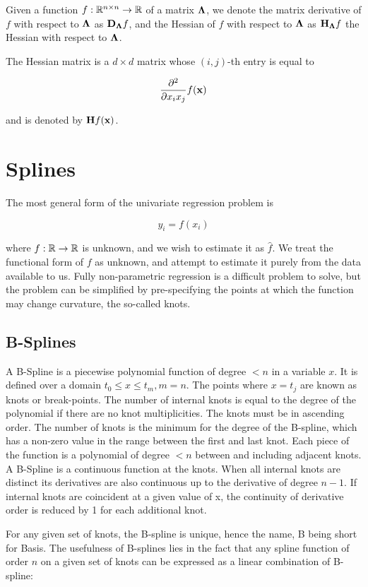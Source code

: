 \documentclass{amsart}[12pt]
\begin{document}
Given a function $f:{\mathbb{R}}^{n \times n} \to {\mathbb{R}}$ of a matrix ${\boldsymbol \Lambda}$, we denote the matrix derivative of $f$ with 
respect to ${\boldsymbol \Lambda}$ as ${\bf D}_{\boldsymbol \Lambda} f$, and the Hessian of $f$ with respect to ${\boldsymbol \Lambda}$ as
${\bf H}_{\boldsymbol \Lambda} f$ the Hessian with respect to ${\boldsymbol \Lambda}$.

The Hessian matrix is a $d \times d$ matrix whose $(i, j)$-th entry is equal to

$$
\frac{\partial^2}{\partial x_i x_j} f({\bf x})
$$

and is denoted by ${\bf H} f({\bf x})$.

\section{Splines}
The most general form of the univariate regression problem is

$$
y_i = f(x_i)
$$

where $f: {\mathbb{R}} \to {\mathbb{R}}$ is unknown, and we wish to estimate it as $\hat{f}$. We treat the functional form of
$f$ as unknown, and attempt to estimate it purely from the data available to us. Fully non-parametric regression
is a difficult problem to solve, but the problem can be simplified by pre-specifying the points at which the
function may change curvature, the so-called knots.

\subsection{B-Splines}
A B-Spline is a piecewise polynomial function of degree $< n$ in a variable $x$. It is defined over a
domain $t_0 \leq x \leq t_m, m=n$. The points where $x = t_j$ are known as knots or break-points. The
number of internal knots is equal to the degree of the polynomial if there are no knot multiplicities.
The knots must be in ascending order. The number of knots is the minimum for the degree of the B-spline,
which has a non-zero value in the range between the first and last knot. Each piece of the function is a
polynomial of degree $< n$ between and including adjacent knots. A B-Spline is a continuous function at the
knots. When all internal knots are distinct its derivatives are also continuous up to the derivative of degree
$n - 1$. If internal knots are coincident at a given value of x, the continuity of derivative order is reduced
by 1 for each additional knot.

For any given set of knots, the B-spline is unique, hence the name, B being short for Basis. The usefulness
of B-splines lies in the fact that any spline function of order $n$ on a given set of knots can be expressed
as a linear combination of B-spline:
\end{document}
